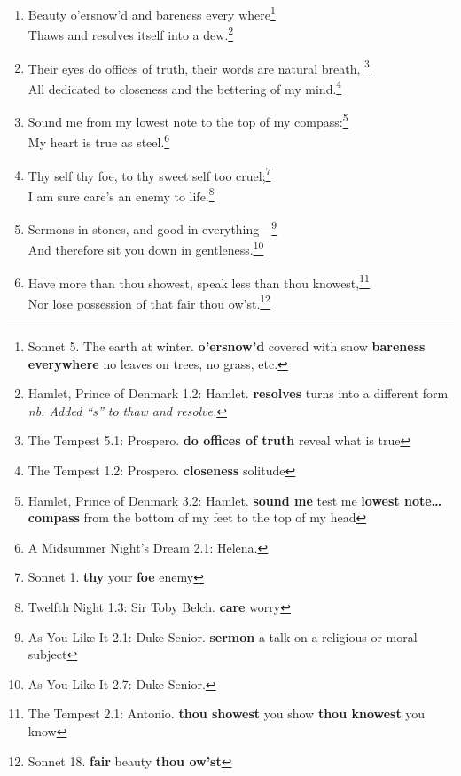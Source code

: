\documentclass[17pt,twoside]{extarticle}
\begin{document}
\begin{enumerate}
  And having climb'd the steep-up heavenly hill,\footnote{Sonnet 7. The
    sun rising.}\\Fortune, good night: smile once more: turn thy
  wheel!\footnote{King Lear 2.2: Kent. \textbf{Fortune} goddess of luck
    \textbf{smile} bring me good luck \textbf{thy} your \textbf{wheel}
    Fortune's wheel, which brings luck, misfortune, or neither.}
\item
  Beauty o'ersnow'd and bareness every where\footnote{Sonnet 5. The
    earth at winter. \textbf{o'ersnow'd} covered with snow
    \textbf{bareness everywhere} no leaves on trees, no grass, etc.}\\Thaws
  and resolves itself into a dew.\footnote{Hamlet, Prince of Denmark
    1.2: Hamlet. \textbf{resolves} turns into a different form \emph{nb.
    Added ``s'' to thaw and resolve.}}
\item
  Their eyes do offices of truth, their words are natural breath,
  \footnote{The Tempest 5.1: Prospero. \textbf{do offices of truth}
    reveal what is true}\\All dedicated to closeness and the bettering
  of my mind.\footnote{The Tempest 1.2: Prospero. \textbf{closeness}
    solitude}
\item
  Sound me from my lowest note to the top of my compass:\footnote{Hamlet,
    Prince of Denmark 3.2: Hamlet. \textbf{sound me} test me
    \textbf{lowest note\ldots{}compass} from the bottom of my feet to
    the top of my head}\\My heart is true as steel.\footnote{A Midsummer
    Night's Dream 2.1: Helena.}
\item
  Thy self thy foe, to thy sweet self too cruel;\footnote{Sonnet 1.
    \textbf{thy} your \textbf{foe} enemy}\\I am sure care's an enemy to
  life.\footnote{Twelfth Night 1.3: Sir Toby Belch. \textbf{care} worry}
\item
  Sermons in stones, and good in everything---\footnote{As You Like It
    2.1: Duke Senior. \textbf{sermon} a talk on a religious or moral
    subject}\\And therefore sit you down in gentleness.\footnote{As You
    Like It 2.7: Duke Senior.}
\item
  Have more than thou showest, speak less than thou knowest,\footnote{The
    Tempest 2.1: Antonio. \textbf{thou showest} you show \textbf{thou
    knowest} you know}\\Nor lose possession of that fair thou
  ow'st.\footnote{Sonnet 18. \textbf{fair} beauty \textbf{thou ow'st}
}
\end{enumerate}
\end{document}
